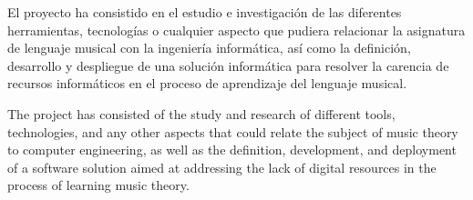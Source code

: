 El proyecto ha consistido en el estudio e investigación de las diferentes herramientas, tecnologías o cualquier aspecto que pudiera relacionar la asignatura de lenguaje musical con la ingeniería informática,
así como la definición, desarrollo y despliegue de una solución informática para resolver la carencia de recursos informáticos en el proceso de aprendizaje del lenguaje musical.

\vspace{1.5cm}

The project has consisted of the study and research of different tools, technologies, and any other aspects that could relate the subject of music theory to computer engineering, as well as the definition, development, and deployment of a software solution aimed at addressing the lack of digital resources in the process of learning music theory.